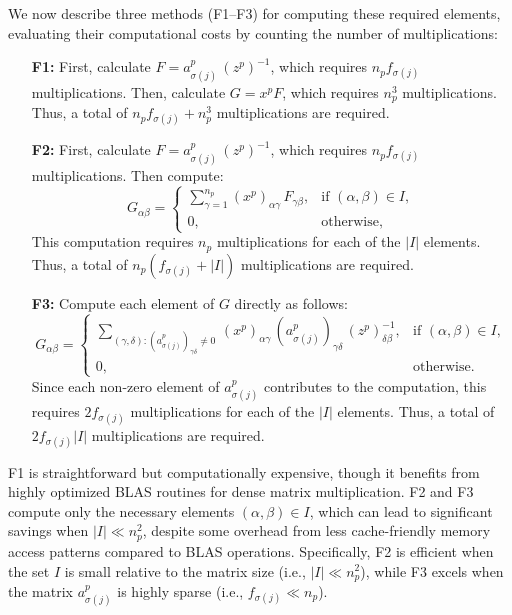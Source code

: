 We now describe three methods (F1--F3) for computing these required elements, evaluating their computational costs by counting the number of multiplications:
\begin{enumerate}
\item[\textbf{F1:}] First, calculate $F=a^p_{\sigma(j)}\,(z^p)^{-1}$, which requires $n_p f_{\sigma(j)}$ multiplications.
           Then, calculate $G=x^p F$, which requires $n_p^3$ multiplications.
           Thus, a total of $n_p f_{\sigma(j)} + n_p^3$ multiplications are required.
\item[\textbf{F2:}] First, calculate $F=a^p_{\sigma(j)}\,(z^p)^{-1}$, which requires $n_p f_{\sigma(j)}$ multiplications. Then compute:
  \[
    G_{\alpha\beta}=
    \begin{cases}
     \sum_{\gamma=1}^{n_p} (x^p)_{\alpha\gamma} \, F_{\gamma\beta}, & \text{if } (\alpha,\beta)\in I,\\
     0, & \text{otherwise},
    \end{cases}
  \]
  This computation requires $n_p$ multiplications for each of the $|I|$ elements.
  Thus, a total of $n_p (f_{\sigma(j)} + |I|)$ multiplications are required.
\item[\textbf{F3:}] Compute each element of $G$ directly as follows:
  \[
    G_{\alpha\beta}=
    \begin{cases}
      \sum_{(\gamma,\delta): (a^p_{\sigma(j)})_{\gamma\delta} \neq 0}\,
        (x^p)_{\alpha\gamma} \, (a^p_{\sigma(j)})_{\gamma\delta} \, (z^p)^{-1}_{\delta\beta},
       & \text{if } (\alpha,\beta) \in I,\\
      0, & \text{otherwise}.
    \end{cases}
  \]
  Since each non-zero element of $a^p_{\sigma(j)}$ contributes to the computation, this requires $2f_{\sigma(j)}$ multiplications for each of the $|I|$ elements.
  Thus, a total of $2f_{\sigma(j)}|I|$ multiplications are required.
\end{enumerate}
F1 is straightforward but computationally expensive, though it benefits from highly optimized BLAS routines for dense matrix multiplication.
F2 and F3 compute only the necessary elements $(\alpha,\beta) \in I$, which can lead to significant savings when $|I| \ll n_p^2$, despite some overhead from less cache-friendly memory access patterns compared to BLAS operations.
Specifically, F2 is efficient when the set $I$ is small relative to the matrix size (i.e., $|I| \ll n_p^2$), while F3 excels when the matrix $a^p_{\sigma(j)}$ is highly sparse (i.e., $f_{\sigma(j)} \ll n_p$).

